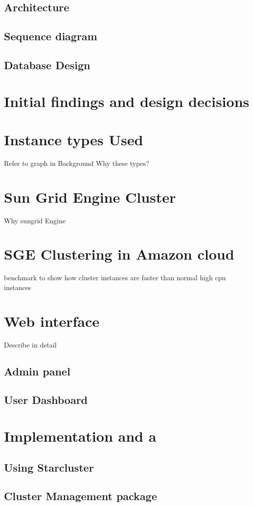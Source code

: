 \documentclass[12pt,a4paper]{report}
\begin{document}
\subsection{Architecture}
\subsection{Sequence diagram}
\subsection{Database Design}

\section{Initial findings and design decisions}
\section{Instance types Used}
Refer to graph in Background
Why these types?
\section{Sun Grid Engine Cluster}
Why sungrid Engine
\section{SGE Clustering in Amazon cloud}
  benchmark to show how cluster instances are faster than normal high cpu instances
\section{Web interface}
Describe in detail
\subsection{Admin panel}
\subsection{User Dashboard}

\section{Implementation and a}
\subsection{Using Starcluster}
\subsection{Cluster Management package}
\end{document}
